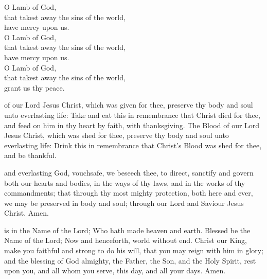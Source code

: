 {\clearpage

\begin{center}
	
O Lamb of God,\\
that takest away the sins of the world,\\
have mercy upon us.\\
O Lamb of God,\\
that takest away the sins of the world,\\
have mercy upon us.\\
O Lamb of God,\\
that takest away the sins of the world,\\
grant us thy peace.
\end{center}





 of our Lord Jesus Christ, which was given for thee,
preserve thy body and soul unto everlasting life:
Take and eat this in remembrance that Christ died for thee,
and feed on him in thy heart by faith, with thanksgiving.
The Blood of our Lord Jesus Christ, which was shed for thee,
preserve thy body and soul unto everlasting life:
Drink this in remembrance that Christ’s Blood was shed for thee, and be thankful.

\vfill



and everlasting God, vouchsafe,
we beseech thee, to direct,
sanctify and govern both our hearts and bodies,
in the ways of thy laws,
and in the works of thy commandments;
that through thy most mighty protection,
both here and ever, we may be preserved in body and soul;
through our Lord and Saviour Jesus Christ.
Amen.

\clearpage 



 is in the Name of the Lord;
Who hath made heaven and earth.
Blessed be the Name of the Lord;
Now and henceforth, world without end.
Christ our King, make you faithful and strong to do his will,
that you may reign with him in glory;
and the blessing of God almighty,
the Father, the Son, and the Holy Spirit,
rest upon you, and all whom you serve,
this day, and all your days.
Amen.

}

